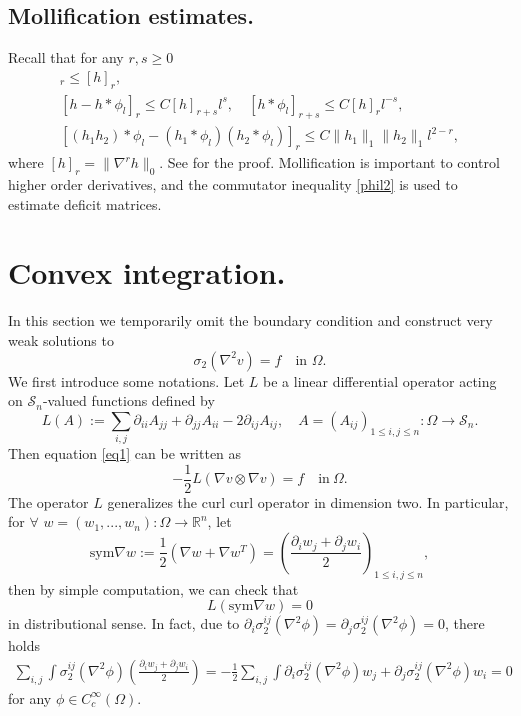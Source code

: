 \documentclass[reqno,12pt]{amsart}
\numberwithin{equation}{section}
\theoremstyle{plain}
\theoremstyle{definition}
\newcommand{\R}{\mathbb{R}}
\renewcommand{\S}{{\mathcal{S}_n}}
\newcommand{\sym}{\text{sym}}
\begin{document}
\subsection{Mollification estimates.} Recall that for any $r,s\ge0$
\begin{gather}
    [h*\phi_l]_{r}\le [h]_{r}, \label{phil3}\\
    [h-h*\phi_l]_{r}\le C[h]_{r+s}l^{s},\quad [h*\phi_l]_{r+s}\le C[h]_r l^{-s},\label{phil1}\\
    [(h_1h_2)*\phi_l-(h_1*\phi_l)(h_2*\phi_l)]_r\le C\|h_1\|_1\|h_2\|_1 l^{2-r},\label{phil2}
\end{gather}
where $[h]_r=\|\nabla^r h\|_0$. See \cite[Lemma 1]{conti12hprinciple} for the proof. Mollification is important to control higher order derivatives, and the commutator inequality \eqref{phil2} is used to estimate deficit matrices. 

\section{Convex integration.}\label{sec1}
In this section we temporarily omit the boundary condition and construct very weak solutions to
\begin{equation}\label{1}
    \sigma_2(\nabla^2 v) = f \quad\text{in }\Omega.
\end{equation}
We first introduce some notations. Let $L$ be a linear differential operator acting on $\S$-valued functions defined by
\begin{equation}\label{defL}
L(A):=\sum_{i,j}\partial_{ii}A_{jj}+\partial_{jj}A_{ii}-2\partial_{ij}
A_{ij},\quad A=(A_{ij})_{1\le i,j\le n}:\Omega\to\S.
\end{equation}
Then equation \eqref{eq1} can be written as
\begin{equation*}
    -\frac{1}{2}L(\nabla v\otimes\nabla v)=f\quad \text{in}\ \Omega.
\end{equation*}
The operator $L$ generalizes the $\text{curl curl}$ operator in dimension two. In particular, for $\forall$ $w=(w_1,...,w_n):\Omega\to\R^n$, let
\begin{equation*}
    \sym\nabla w:=\frac{1}{2}(\nabla w+\nabla w^T)
    =(\frac{\partial_i w_j+\partial_j w_i}{2})_{1\le i,j\le n},
\end{equation*}
then by simple computation, we can check that
\begin{equation*}
    L(\sym\nabla w)=0
\end{equation*}
in distributional sense.
In fact, due to $\partial_i\sigma_2^{ij}(\nabla^2\phi)=\partial_j\sigma_2^{ij}(\nabla^2\phi)=0$, there holds
    \begin{align*}
        \sum_{i,j}\int \sigma_2^{ij}(\nabla^2\phi)(\frac{\partial_i w_j+\partial_j w_i}{2})
        =-\frac{1}{2}\sum_{i,j}\int \partial_i\sigma_2^{ij}(\nabla^2\phi)w_j
        +\partial_j\sigma_2^{ij}(\nabla^2\phi)w_i
        =0
    \end{align*}
for any $\phi\in C_c^\infty(\Omega)$.
\end{document}
